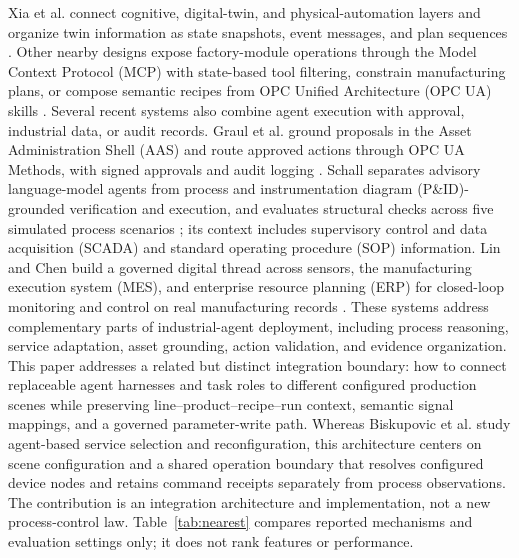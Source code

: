Xia et al. connect cognitive, digital-twin, and physical-automation layers and
organize twin information as state snapshots, event messages, and plan
sequences \cite{xia2025architecture}. Other nearby designs expose factory-module
operations through the Model Context Protocol (MCP) with state-based tool
filtering, constrain manufacturing plans, or compose semantic recipes from
OPC Unified Architecture (OPC UA) skills
\cite{koehle2026llmdriven,silva2025mcpmanufacturing,koehle2025semanticrecipes}.
Several recent systems also combine agent execution with approval, industrial
data, or audit records. Graul et al. ground proposals in the Asset
Administration Shell (AAS) and route approved actions through OPC UA Methods,
with signed approvals and audit logging \cite{graul2026aas}. Schall separates
advisory language-model agents from process and instrumentation diagram
(P\&ID)-grounded verification and execution, and evaluates structural checks
across five simulated process scenarios \cite{schall2026safe}; its context
includes supervisory control and data acquisition (SCADA) and standard
operating procedure (SOP) information. Lin and Chen build a governed digital
thread across sensors, the manufacturing execution system (MES), and enterprise
resource planning (ERP) for closed-loop monitoring and control on real
manufacturing records \cite{lin2026agentic}. These systems address
complementary parts of industrial-agent deployment, including process
reasoning, service adaptation, asset grounding, action validation, and
evidence organization. This paper addresses a related but distinct integration
boundary: how to connect replaceable agent harnesses and task roles to
different configured production scenes while preserving
line--product--recipe--run context, semantic signal mappings, and a governed
parameter-write path. Whereas Biskupovic et al. study agent-based service
selection and reconfiguration, this architecture centers on scene configuration
and a shared operation boundary that resolves configured device nodes and
retains command receipts separately from process observations. The contribution
is an integration architecture and implementation, not a new process-control
law. Table~\ref{tab:nearest} compares reported mechanisms and evaluation
settings only; it does not rank features or performance.
